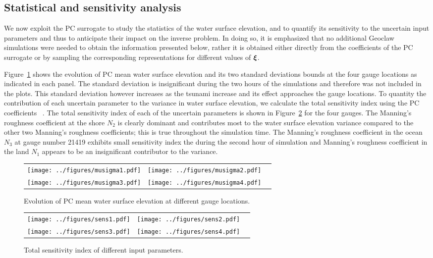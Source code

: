 \subsection{Statistical and sensitivity analysis}
\label{sec:forward}
We now exploit the PC surrogate to study the statistics of the 
water surface elevation, and to quantify its sensitivity to the
uncertain input parameters and thus to anticipate their impact on
the inverse problem.  In doing so, it is emphasized that 
no additional Geoclaw simulations were needed to obtain
the information presented below, rather it is obtained either directly 
from the coefficients of the PC surrogate or by sampling the corresponding
representations for different values of $\xxi$.

Figure~\ref{fig:ave} shows the evolution of
PC mean water surface elevation and its two standard deviations
bounds at the four gauge locations as indicated in each panel.  
The standard deviation is insignificant during the two hours
of the simulations and therefore was not included in the plots.
This standard deviation however increases as the tsunami increase
and its effect approaches the gauge locations. 
To quantity the contribution of each
uncertain parameter to the variance in water surface elevation, we calculate the total sensitivity index 
using the PC coefficients ~\citep{Alexanderian2012,Sudret,Crestaux}. The total sensitivity index
of  each of the uncertain parameters is shown in
Figure~\ref{fig:sens} for the four gauges. The Manning's roughness coefficient
at the shore $N_2$ is clearly dominant and contributes
most to the  water surface elevation variance compared to the other two 
Manning's roughness coefficients;
this is true throughout the simulation time.  The Manning's roughness coefficient
in the ocean $N_{3}$ at gauge number 21419 exhibits small sensitivity index 
the during the second hour of simulation and Manning's roughness coefficient
in the land $N_1$ appears to be an insignificant contributor
to the variance.
\begin{figure}[h]
\begin{tabular}{clc}
        
\texttt{[image: ../figures/musigma1.pdf]} &
\texttt{[image: ../figures/musigma2.pdf]} \\
\texttt{[image: ../figures/musigma3.pdf]} &
\texttt{[image: ../figures/musigma4.pdf]}
\end{tabular}
\caption{Evolution of PC mean water surface elevation at different gauge locations.}
\label{fig:ave}
\end{figure}
\begin{figure}[h]
\begin{tabular}{clc}
\texttt{[image: ../figures/sens1.pdf]} &
\texttt{[image: ../figures/sens2.pdf]} \\
\texttt{[image: ../figures/sens3.pdf]} &
\texttt{[image: ../figures/sens4.pdf]}
\end{tabular}
\caption{Total sensitivity index of different input parameters.}
\label{fig:sens}
\end{figure}


